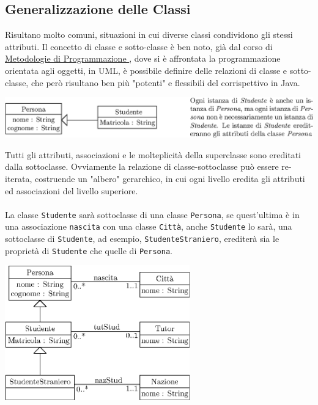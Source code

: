 \documentclass[12pt, letterpaper]{article}
\newcommand{\code}[1]{\colorbox{light-gray}{\texttt{#1}}}
\newcommand{\acc}{\\\hphantom{}\\}
\begin{document}
\subsection{Generalizzazione delle Classi}
Risultano molto comuni, situazioni in cui diverse classi condividono gli stessi attributi. Il concetto di classe e sotto-classe 
è ben noto, già dal corso di
\color{blue}\href{https://github.com/CasuFrost/University_notes/blob/main/Primo%20Anno/Secondo%20Semestre/Metodologie%20di%20Programmazione/Appunti%20Metodologie%20di%20programmazione.pdf}{
    Metodologie di Programmazione
}\color{black}, dove si è affrontata la programmazione orientata agli oggetti, in UML, è possibile definire delle relazioni 
di classe e sotto-classe, che però risultano ben più "potenti" e flessibili del corrispettivo in Java.\begin{center}
    \includegraphics[width=\textwidth ]{images/sottoclasse..eps}
\end{center} 
Tutti gli attributi, associazioni e le molteplicità della superclasse sono ereditati dalla sottoclasse. Ovviamente 
la relazione di classe-sottoclasse può essere re-iterata, costruende un "albero" gerarchico, in cui ogni 
livello eredita gli attributi ed associazioni del livello superiore.\acc La classe \code{Studente} sarà sottoclasse di 
una classe \code{Persona}, se quest'ultima è in una associazione \code{nascita} con una classe \code{Città}, anche 
\code{Studente} lo sarà, una sottoclasse di \code{Studente}, ad esempio, \code{StudenteStraniero}, erediterà sia 
le proprietà di \code{Studente} che quelle di \code{Persona}. \begin{center}
    \includegraphics[width=0.6\textwidth ]{images/studStraniero.eps}
\end{center} 
\end{document}
